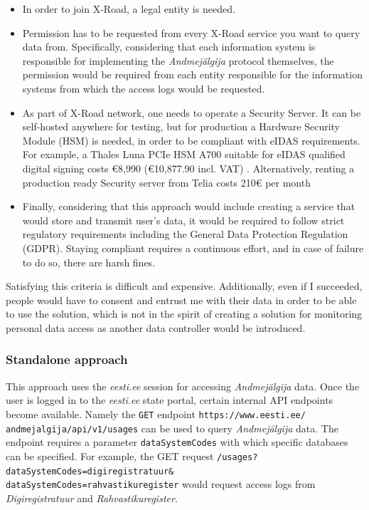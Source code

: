 \begin{itemize}
    \item {In order to join X-Road, a legal entity is needed.}
    \item {Permission has to be requested from every X-Road service you want to query data from. Specifically, considering that each information system is responsible for implementing the \textit{Andmejälgija} protocol themselves, the permission would be required from each entity responsible for the information systems from which the access logs would be requested.}
    \item {As part of X-Road network, one needs to operate a Security Server. It can be self-hosted anywhere for testing, but for production a Hardware Security Module (HSM) is needed, in order to be compliant with eIDAS requirements. For example, a Thales Luna PCIe HSM A700 suitable for eIDAS qualified digital signing costs €8,990 (€10,877.90 incl. VAT) \cite{thales-luna-hsm-pricing}. Alternatively, renting a production ready Security server from Telia costs 210€ per month \cite{telia-xroad-server}}
    \item {Finally, considering that this approach would include creating a service that would store and transmit user's data, it would be required to follow strict regulatory requirements including the General Data Protection Regulation (GDPR). Staying compliant requires a continuous effort, and in case of failure to do so, there are harsh fines.}
\end{itemize}

Satisfying this criteria is difficult and expensive. Additionally, even if I succeeded, people would have to consent and entrust me with their data in order to be able to use the solution, which is not in the spirit of creating a solution for monitoring personal data access as another data controller would be introduced.

\subsubsection{Standalone approach}
This approach uses the \textit{eesti.ee} session for accessing \textit{Andmejälgija} data. Once the user is logged in to the \textit{eesti.ee} state portal, certain internal API endpoints become available. Namely the \texttt{GET} endpoint \texttt{https://www.eesti.ee/\\andmejalgija/api/v1/usages} can be used to query \textit{Andmejälgija} data. The endpoint requires a parameter \texttt{dataSystemCodes} with which specific databases can be specified. For example, the GET request \texttt{/usages?dataSystemCodes=digiregistratuur\&\\dataSystemCodes=rahvastikuregister} would request access logs from \textit{Digiregistratuur} and \textit{Rahvastikuregister}.

